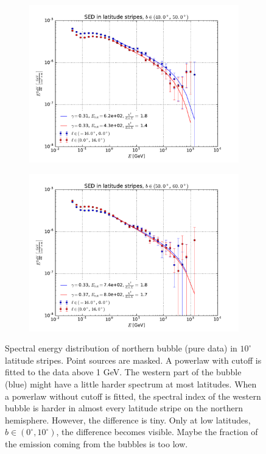 \documentclass[a4paper]{article}
\begin{document}
\begin{figure}
\begin{subfigure}{0.5\textwidth}
        \includegraphics[width=\textwidth]{spectrum_of_top_bubble_in_lat_stripes_40-50.pdf}
    \end{subfigure} 
    \begin{subfigure}{0.5\textwidth}
        \includegraphics[width=\textwidth]{spectrum_of_top_bubble_in_lat_stripes_50-60.pdf}
    \end{subfigure}
    \caption{Spectral energy distribution of northern bubble (pure data) in $10^\circ$ latitude stripes. Point sources are masked. A powerlaw with cutoff is fitted to the data above 1 GeV. The western part of the bubble (blue) might have a little harder spectrum at most latitudes. When a powerlaw without cutoff is fitted, the spectral index of the western bubble is harder in almost every latitude stripe on the northern hemisphere. However, the difference is tiny. Only at low latitudes, $b \in (0^\circ, 10^\circ)$, the difference becomes visible. Maybe the fraction of the emission coming from the bubbles is too low.}
\end{figure}
\end{document}

